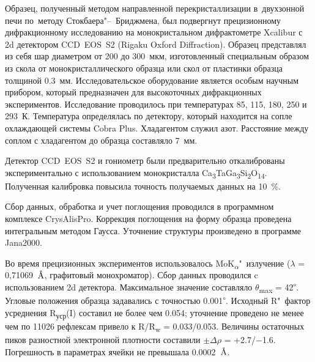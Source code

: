 Образец, полученный методом направленной перекристаллизации в~двухзонной печи по~методу Стокбаера"--~Бриджмена, был подвергнут прецизионному дифракционному исследованию на монокристальном дифрактометре Xcalibur с 2d детектором CCD~EOS~S2 (Rigaku Oxford Diffraction). Образец представлял из себя шар диаметром от 200 до 300~мкм, изготовленный специальным образом из скола от монокристаллического образца или скол от пластинки образца толщиной 0.3~мм. Исследовательское оборудование является особым научным прибором, который предназначен для высокоточных дифракционных экспериментов. Исследование проводилось при температурах 85, 115, 180, 250 и 293~К\cite{Dudka2016}. Температура определялась по детектору, который находится на сопле охлаждающей системы Cobra Plus. Хладагентом служил азот. Расстояние между соплом с хладагентом до образца составляло 7~мм.

Детектор CCD~EOS~S2 и гониометр были предварительно откалиброваны экспериментально\cite{Dudka2010} с использованием монокристалла Ca\textsubscript{3}TaGa\textsubscript{3}Si\textsubscript{2}O\textsubscript{14}\cite{Dudka2016_b}. Полученная калибровка повысила точность получаемых данных на 10~\%.

Сбор данных, обработка и учет поглощения проводился в программном комплексе  CrysAlisPro. Коррекция поглощения на форму образца проведена интегральным методом Гаусса. Уточнение структуры произведено в программе Jana2000\cite{Dusek2001}.






Во время прецизионных  экспериментов использовалось MoK\textsubscript{$\alpha$}"~излучение ($\lambda$ = 0,71069~${\mbox{\normalfont\AA}}$, графитовый монохроматор). Сбор данных проводился c использованием 2d детектора. Максимальное значение составляло $\theta$\textsubscript{max} = 42\textsuperscript{$\circ$}.
Угловые положения образца задавались с точностью 0.001\textsuperscript{$\circ$}.
Исходный R"~фактор усреднения R\textsubscript{уср}(I) составил не более чем  0.054; уточнение проведено не менее чем по 11026 рефлексам привело к R/R\textsubscript{w} = 0.033/0.053.
Величины остаточных пиков разностной электронной плотности составили $\pm\Delta$$\rho$ = +2.7/$-$1.6.
Погрешность в параметрах ячейки не превышала 0.0002~{$\mbox{\normalfont\AA}$}.

